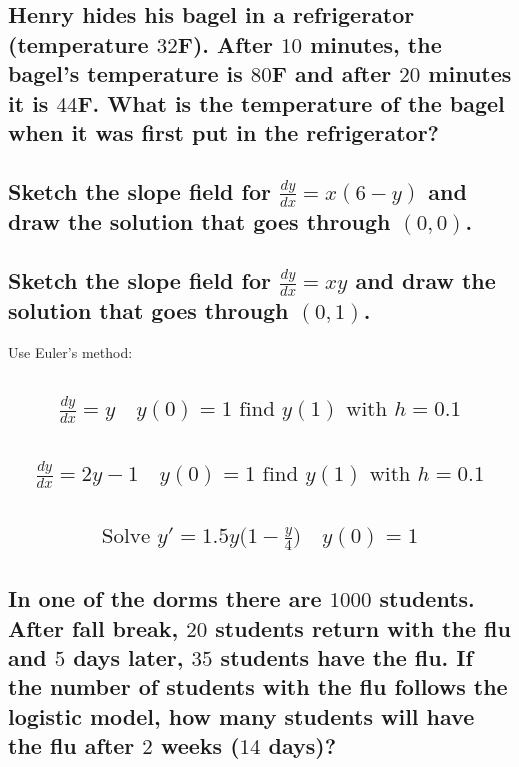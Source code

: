 \documentclass{article}
\begin{document}
\subsection{Henry hides his bagel in a refrigerator (temperature $32$F). After $10$ minutes, the bagel's temperature is $80$F and after $20$ minutes it is $44$F. What is the temperature of the bagel when it was first put in the refrigerator?}

\subsection{Sketch the slope field for $\frac{dy}{dx} = x(6 - y)$ and draw the solution that goes through $(0, 0)$.}

\subsection{Sketch the slope field for $\frac{dy}{dx} = xy$ and draw the solution that goes through $(0, 1)$.}

Use Euler's method:
\subsection{
	\begin{align*}
		\frac{dy}{dx} = y \quad y(0) = 1 \text{ find } y(1) \text{ with } h = 0.1
	\end{align*}
}

\subsection{
	\begin{align*}
		\frac{dy}{dx} = 2y - 1 \quad y(0) = 1 \text{ find } y(1) \text{ with } h = 0.1
	\end{align*}
}

\subsection{
	\begin{align*}
		\text{Solve } y' = 1.5y\bigg( 1 - \frac{y}{4} \bigg) \quad y(0) = 1
	\end{align*}
}

\subsection{In one of the dorms there are $1000$ students. After fall break, $20$ students return with the flu and $5$ days later, $35$ students have the flu. If the number of students with the flu follows the logistic model, how many students will have the flu after $2$ weeks ($14$ days)?}
\end{document}
